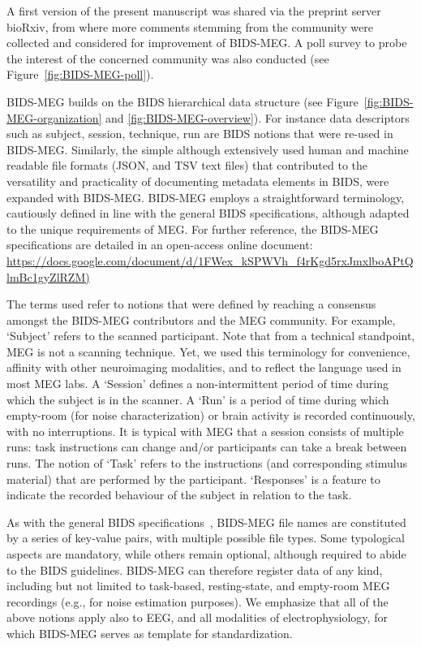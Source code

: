 A first version of the present manuscript was shared via the preprint server bioRxiv, from where more comments stemming from the community were collected and considered for improvement of BIDS-MEG. A poll survey to probe the interest of the concerned community was also conducted (see Figure~\ref{fig:BIDS-MEG-poll}).

BIDS-MEG builds on the BIDS hierarchical data structure (see Figure~\ref{fig:BIDS-MEG-organization} and \ref{fig:BIDS-MEG-overview}). For instance data descriptors such as subject, session, technique, run are BIDS notions that were re-used in BIDS-MEG. Similarly, the simple although extensively used human and machine readable file formats (\ac{JSON}, and \ac{TSV} text files) that contributed to the versatility and practicality of documenting metadata elements in BIDS, were expanded with BIDS-MEG. BIDS-MEG employs a straightforward terminology, cautiously defined in line with the general BIDS specifications, although adapted to the unique requirements of MEG.  For further reference, the BIDS-MEG specifications are detailed in an open-access online document:
\url{https://docs.google.com/document/d/1FWex_kSPWVh_f4rKgd5rxJmxlboAPtQlmBc1gyZlRZM)}

The terms used refer to notions that were defined by reaching a consensus amongst the BIDS-MEG contributors and the MEG community. For example, ‘Subject’ refers to the scanned participant. Note that from a technical standpoint, MEG is not a scanning technique. Yet, we used this terminology for convenience, affinity with other neuroimaging modalities, and to reflect the language used in most MEG labs. A ‘Session’ defines a non-intermittent period of time during which the subject is in the scanner.  A ‘Run’ is a period of time during which empty-room (for noise characterization) or brain activity is recorded continuously, with no interruptions. It is typical with MEG that a session consists of multiple runs: task instructions can change and/or participants can take a break between runs. The notion of ‘Task’ refers to the instructions (and corresponding stimulus material) that are performed by the participant. ‘Responses’ is a feature to indicate the recorded behaviour of the subject in relation to the task.

As with the general BIDS specifications~\citep{gorgolewski2016brain}, BIDS-MEG file names are constituted by a series of key-value pairs, with multiple possible file types. Some  typological aspects are mandatory, while others remain optional, although required to abide to the BIDS guidelines. BIDS-MEG can therefore register data of any kind, including but not limited to task-based, resting-state, and empty-room MEG recordings (e.g., for noise estimation purposes). We emphasize that all of the above notions apply also to EEG, and all modalities of electrophysiology, for which BIDS-MEG serves as template for standardization.  

